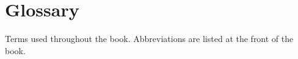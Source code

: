 \chapter{Glossary}\label{app:glossary}

Terms used throughout the book. Abbreviations are listed at the front of the book.

